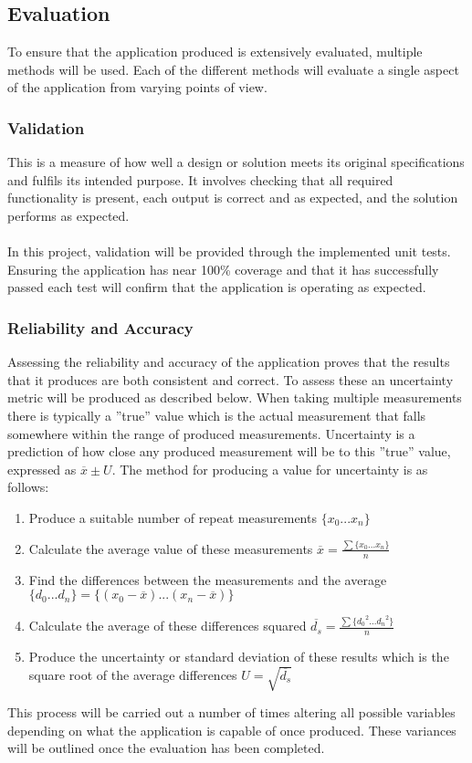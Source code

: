 	\subsection{Evaluation}\label{sec:methodology_evaluation}
		To ensure that the application produced is extensively evaluated, multiple methods will be used. Each of the different methods will evaluate a single aspect of the application from varying points of view.
		\subsubsection{Validation}
			This is a measure of how well a design or solution meets its original specifications and fulfils its intended purpose. It involves checking that all required functionality is present, each output is correct and as expected, and the solution performs as expected.
			\\\\
			In this project, validation will be provided through the implemented unit tests. Ensuring the application has near 100\% coverage and that it has successfully passed each test will confirm that the application is operating as expected.
		\subsubsection{Reliability and Accuracy}
			Assessing the reliability and accuracy of the application proves that the results that it produces are both consistent and correct. To assess these an uncertainty metric will be produced as described below. When taking multiple measurements there is typically a ”true” value which is the actual measurement that falls somewhere within the range of produced measurements. Uncertainty is a prediction of how close any produced measurement will be to this ”true” value, expressed as $\overline{x} \pm U$. The method for producing a value for uncertainty is as follows:
			\begin{enumerate}
				\item Produce a suitable number of repeat measurements $\{x_0 ... x_n\}$
				\item Calculate the average value of these measurements $\overline{x}=\frac{\sum\{x_0...x_n\}}{n}$
				\item Find the differences between the measurements and the average $\{d_0...d_n\} = \{(x_0-\overline{x})...(x_n-\overline{x})\}$
				\item Calculate the average of these differences squared $\overline{d_s} = \frac{\sum\{{d_0}^2...{d_n}^2\}}{n}$
				\item Produce the uncertainty or standard deviation of these results which is the square root of the average differences $U= \sqrt{\overline{d_s}}$
			\end{enumerate}
			This process will be carried out a number of times altering all possible variables depending on what the application is capable of once produced. These variances will be outlined once the evaluation has been completed.
